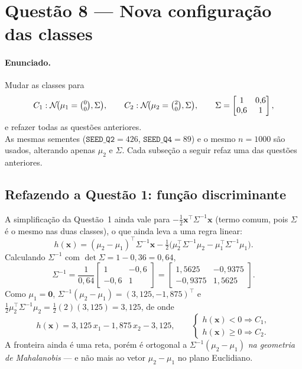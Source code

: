 ﻿\documentclass[12pt,a4paper]{article}
\begin{document}
\section*{Quest\~ao 8 --- Nova configura\c{c}\~ao das classes}

\paragraph{Enunciado.} Mudar as classes para
\[
C_1:\mathcal{N}\!\bigl(\mu_1=\tbinom{0}{0},\Sigma\bigr),\qquad
C_2:\mathcal{N}\!\bigl(\mu_2=\tbinom{2}{0},\Sigma\bigr),\qquad
\Sigma=\begin{bmatrix}1 & 0{,}6\\ 0{,}6 & 1\end{bmatrix},
\]
e refazer todas as quest\~oes anteriores.\\[4pt]
As mesmas sementes ($\mathtt{SEED\_Q2}=426$, $\mathtt{SEED\_Q4}=89$) e
o mesmo $n=1000$ s\~ao usados, alterando apenas $\mu_2$ e $\Sigma$. Cada
subse\c{c}\~ao a seguir refaz uma das quest\~oes anteriores.

\subsection*{Refazendo a Quest\~ao 1: fun\c{c}\~ao discriminante}

A simplifica\c{c}\~ao da Quest\~ao~1 ainda vale para
$-\tfrac12\mathbf{x}^\top\Sigma^{-1}\mathbf{x}$ (termo comum, pois $\Sigma$ \'e o
mesmo nas duas classes), o que ainda leva a uma regra linear:
\[
h(\mathbf{x})=(\mu_2-\mu_1)^\top\Sigma^{-1}\mathbf{x}-
\tfrac12\bigl(\mu_2^\top\Sigma^{-1}\mu_2-\mu_1^\top\Sigma^{-1}\mu_1\bigr).
\]
Calculando $\Sigma^{-1}$ com $\det\Sigma=1-0{,}36=0{,}64$,
\[
\Sigma^{-1}=\frac{1}{0{,}64}\begin{bmatrix}1 & -0{,}6\\ -0{,}6 & 1\end{bmatrix}
=\begin{bmatrix}1{,}5625 & -0{,}9375\\ -0{,}9375 & 1{,}5625\end{bmatrix}.
\]
Como $\mu_1=\mathbf{0}$, $\Sigma^{-1}(\mu_2-\mu_1)=(3{,}125,-1{,}875)^\top$
e $\tfrac12\mu_2^\top\Sigma^{-1}\mu_2=\tfrac12(2)(3{,}125)=3{,}125$, de
onde
\[
h(\mathbf{x})=3{,}125\,x_1-1{,}875\,x_2-3{,}125,
\qquad
\begin{cases}
h(\mathbf{x})<0\Rightarrow C_1,\\
h(\mathbf{x})\ge 0\Rightarrow C_2.
\end{cases}
\]
A fronteira ainda \'e uma reta, por\'em \'e ortogonal a
$\Sigma^{-1}(\mu_2-\mu_1)$ \emph{na geometria de Mahalanobis} --- e n\~ao
mais ao vetor $\mu_2-\mu_1$ no plano Euclidiano.
\end{document}
